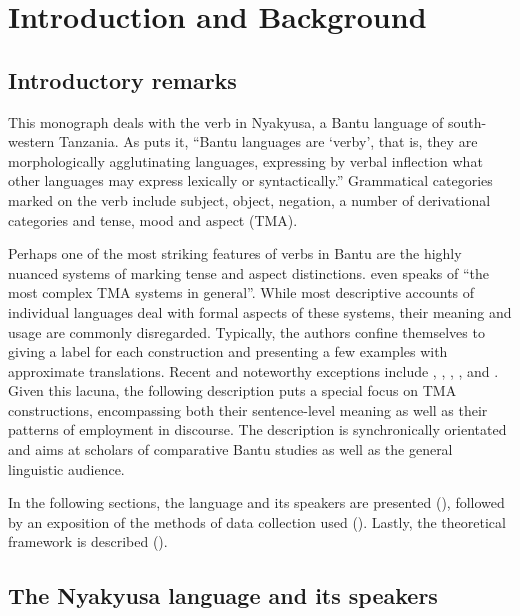 \chapter{Introduction and Background}
\section{Introductory remarks}
This monograph deals with the verb in Nyakyusa, a Bantu language of south-western Tanzania. As \citet[21]{NurseD2008} puts it, ``Bantu languages are `verby', that is, they are morphologically agglutinating languages, expressing by verbal inflection what other languages may express lexically or syntactically.'' Grammatical categories marked on the verb include subject, object, negation, a number of derivational categories and tense, mood and aspect (TMA).

Perhaps one of the most striking features of verbs in Bantu are the highly nuanced systems of marking tense and aspect distinctions. \citet[185]{DahlOe1985} even speaks of ``the most complex TMA systems in general''. While most descriptive accounts of individual languages deal with formal aspects of these systems, their meaning and usage are commonly disregarded. Typically, the authors confine themselves to giving a label for each construction and presenting a few examples with approximate translations. Recent and noteworthy exceptions include \citet{FleischA2000}, \citet{KershnerT2002}, \citet{BotneROchwadaHMarloM2006}, \citet{BotneR2008}, and \citet{CraneTM2011}. Given this lacuna, the following description puts a special focus on TMA constructions, encompassing both their sentence-level meaning as well as their patterns of employment in discourse. The description is synchronically orientated and aims at scholars of comparative Bantu studies as well as the general linguistic audience.

In the following sections, the language and its speakers are presented (), followed by an exposition of the methods of data collection used (). Lastly, the theoretical framework is described ().
\section{The Nyakyusa language and its speakers}\label{LanguageAndSpeakers}
